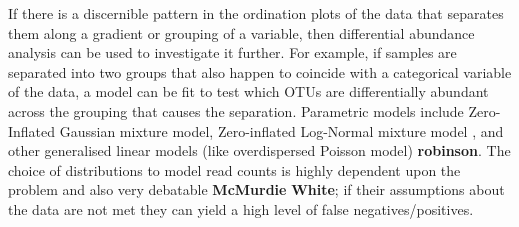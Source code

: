 If there is a discernible pattern in the ordination plots of the data that separates them along a gradient or grouping of a variable, then differential  abundance analysis can be used to investigate it further. For example, if samples are separated into two groups that also happen to coincide with a categorical variable of the data, a model can be fit to test which OTUs are differentially abundant across the grouping that causes the separation. Parametric models include Zero-Inflated Gaussian mixture model,   Zero-inflated Log-Normal mixture model \cite{css_diff_abund}, and other generalised linear models (like overdispersed Poisson model) \textbf{robinson}. The choice of distributions to model read counts is highly dependent upon the problem and also very debatable \cite{css_diff_abund} \textbf{McMurdie} \textbf{White}; if their assumptions about the data are not met they can yield a high level of false negatives/positives. 

